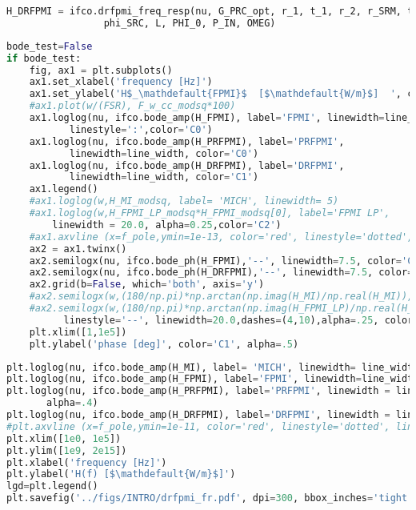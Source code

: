 \begin{lstlisting}[frame=single, language=Python]
H_DRFPMI = ifco.drfpmi_freq_resp(nu, G_PRC_opt, r_1, t_1, r_2, r_SRM, t_SRM, 
				 phi_SRC, L, PHI_0, P_IN, OMEG)
\end{lstlisting}

\begin{lstlisting}[frame=single, language=Python]
bode_test=False
if bode_test:
    fig, ax1 = plt.subplots()
    ax1.set_xlabel('frequency [Hz]')
    ax1.set_ylabel('H$_\mathdefault{FPMI}$  [$\mathdefault{W/m}$]  ', color='C0')
    #ax1.plot(w/(FSR), F_w_cc_modsq*100)
    ax1.loglog(nu, ifco.bode_amp(H_FPMI), label='FPMI', linewidth=line_width, 
	       linestyle=':',color='C0')
    ax1.loglog(nu, ifco.bode_amp(H_PRFPMI), label='PRFPMI',  
	       linewidth=line_width, color='C0')
    ax1.loglog(nu, ifco.bode_amp(H_DRFPMI), label='DRFPMI',  
	       linewidth=line_width, color='C1')
    ax1.legend()
    #ax1.loglog(w,H_MI_modsq, label= 'MICH', linewidth= 5)
    #ax1.loglog(w,H_FPMI_LP_modsq*H_FPMI_modsq[0], label='FPMI LP', 
		linewidth = 20.0, alpha=0.25,color='C2')
    #ax1.axvline (x=f_pole,ymin=1e-13, color='red', linestyle='dotted', linewidth=3)
    ax2 = ax1.twinx()
    ax2.semilogx(nu, ifco.bode_ph(H_FPMI),'--', linewidth=7.5, color='C0', alpha=.3)
    ax2.semilogx(nu, ifco.bode_ph(H_DRFPMI),'--', linewidth=7.5, color='C1', alpha=.3)
    ax2.grid(b=False, which='both', axis='y')
    #ax2.semilogx(w,(180/np.pi)*np.arctan(np.imag(H_MI)/np.real(H_MI)), '--')
    #ax2.semilogx(w,(180/np.pi)*np.arctan(np.imag(H_FPMI_LP)/np.real(H_FPMI_LP)),
		  linestyle='--', linewidth=20.0,dashes=(4,10),alpha=.25, color='C2')
    plt.xlim([1,1e5])
    plt.ylabel('phase [deg]', color='C1', alpha=.5)
\end{lstlisting}

\begin{lstlisting}[frame=single, language=Python]
plt.loglog(nu, ifco.bode_amp(H_MI), label= 'MICH', linewidth= line_width, alpha=.4)
plt.loglog(nu, ifco.bode_amp(H_FPMI), label='FPMI', linewidth=line_width, alpha=.4)
plt.loglog(nu, ifco.bode_amp(H_PRFPMI), label='PRFPMI', linewidth = line_width, 
	   alpha=.4)
plt.loglog(nu, ifco.bode_amp(H_DRFPMI), label='DRFPMI', linewidth = line_width)
#plt.axvline (x=f_pole,ymin=1e-11, color='red', linestyle='dotted', linewidth=3)
plt.xlim([1e0, 1e5])
plt.ylim([1e9, 2e15])
plt.xlabel('frequency [Hz]')
plt.ylabel('H(f) [$\mathdefault{W/m}$]')
lgd=plt.legend()
plt.savefig('../figs/INTRO/drfpmi_fr.pdf', dpi=300, bbox_inches='tight')
\end{lstlisting}

